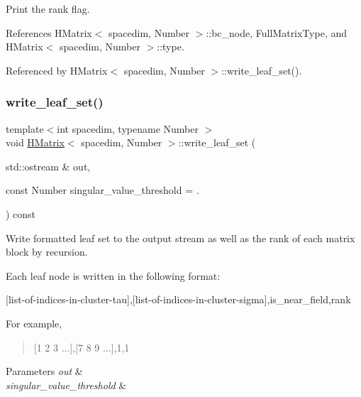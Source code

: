 Print the {\ttfamily rank} flag.

References H\+Matrix$<$ spacedim, Number $>$\+::bc\+\_\+node, Full\+Matrix\+Type, and H\+Matrix$<$ spacedim, Number $>$\+::type.



Referenced by H\+Matrix$<$ spacedim, Number $>$\+::write\+\_\+leaf\+\_\+set().

\mbox{\label{classHMatrix_aaf0ae0960a40ad78a941aee823e80315}} 
\subsubsection{\texorpdfstring{write\+\_\+leaf\+\_\+set()}{write\_leaf\_set()}}
{\footnotesize\ttfamily template$<$int spacedim, typename Number $>$ \\
void \hyperlink{classHMatrix}{H\+Matrix}$<$ spacedim, Number $>$\+::write\+\_\+leaf\+\_\+set (\begin{DoxyParamCaption}\item[{std\+::ostream \&}]{out,  }\item[{const Number}]{singular\+\_\+value\+\_\+threshold = {.} }\end{DoxyParamCaption}) const}

Write formatted leaf set to the output stream as well as the rank of each matrix block by recursion.

Each leaf node is written in the following format\+:

\begin{quote}


\end{quote}
\mbox{[}list-\/of-\/indices-\/in-\/cluster-\/tau\mbox{]},\mbox{[}list-\/of-\/indices-\/in-\/cluster-\/sigma\mbox{]},is\+\_\+near\+\_\+field,rank

For example,

\begin{quote}
\mbox{[}1 2 3 ...\mbox{]},\mbox{[}7 8 9 ...\mbox{]},1,1 \end{quote}

\begin{DoxyParams}{Parameters}
{\em out} & \\
\hline
{\em singular\+\_\+value\+\_\+threshold} & \\
\hline
\end{DoxyParams}


